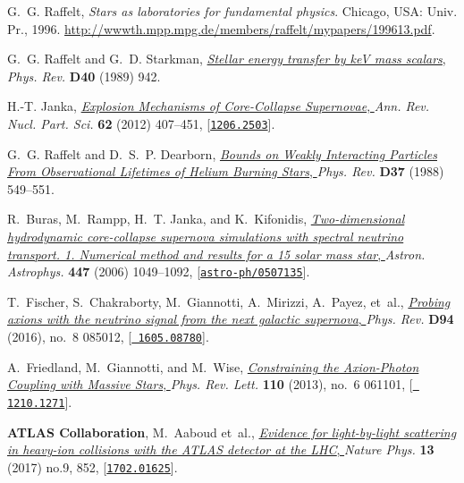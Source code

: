 \documentclass[11pt,a4paper]{article}
\begin{document}
\begin{thebibliography}{10}
G.~G. Raffelt, {\em {Stars as laboratories for fundamental physics}}.
\newblock Chicago, USA: Univ. Pr., 1996.
\newblock \url{http://wwwth.mpp.mpg.de/members/raffelt/mypapers/199613.pdf}.

G.~G. Raffelt and G.~D. Starkman,
  \href{http://dx.doi.org/10.1103/PhysRevD.40.942}{{\it {Stellar energy
  transfer by keV mass scalars}}, } {\em Phys. Rev.} {\bf D40} (1989) 942.

H.-T. Janka, \href{http://dx.doi.org/10.1146/annurev-nucl-102711-094901}{{\it
  {Explosion Mechanisms of Core-Collapse Supernovae}}, } {\em Ann. Rev. Nucl.
  Part. Sci.} {\bf 62} (2012) 407--451,
  [\href{http://arxiv.org/abs/1206.2503}{{\tt 1206.2503}}].

G.~G. Raffelt and D.~S.~P. Dearborn,
  \href{http://dx.doi.org/10.1103/PhysRevD.37.549}{{\it {Bounds on Weakly
  Interacting Particles From Observational Lifetimes of Helium Burning Stars}},
  } {\em Phys. Rev.} {\bf D37} (1988) 549--551.

R.~Buras, M.~Rampp, H.~T. Janka, and K.~Kifonidis,
  \href{http://dx.doi.org/10.1051/0004-6361:20053783}{{\it {Two-dimensional
  hydrodynamic core-collapse supernova simulations with spectral neutrino
  transport. 1. Numerical method and results for a 15 solar mass star}}, } {\em
  Astron. Astrophys.} {\bf 447} (2006) 1049--1092,
  [\href{http://arxiv.org/abs/astro-ph/0507135}{{\tt astro-ph/0507135}}].

T.~Fischer, S.~Chakraborty, M.~Giannotti, A.~Mirizzi, A.~Payez, et~al.,
  \href{http://dx.doi.org/10.1103/PhysRevD.94.085012}{{\it {Probing axions with
  the neutrino signal from the next galactic supernova}}, } {\em Phys. Rev.}
  {\bf D94} (2016), no.~8 085012, [\href{http://arxiv.org/abs/1605.08780}{{\tt
  1605.08780}}].

A.~Friedland, M.~Giannotti, and M.~Wise,
  \href{http://dx.doi.org/10.1103/PhysRevLett.110.061101}{{\it {Constraining
  the Axion-Photon Coupling with Massive Stars}}, } {\em Phys. Rev. Lett.} {\bf
  110} (2013), no.~6 061101, [\href{http://arxiv.org/abs/1210.1271}{{\tt
  1210.1271}}].

{\bf ATLAS Collaboration}, M.~Aaboud et~al.,
  \href{http://dx.doi.org/doi:10.1038/nphys4208}{{\it {Evidence for light-by-light scattering in heavy-ion collisions with the ATLAS detector at the LHC}}, } {\em Nature Phys.} {\bf 13} (2017) no.9,  852, [\href{http://arxiv.org/abs/1702.01625}{{\tt 1702.01625}}].
  

\end{thebibliography}
\end{document}
